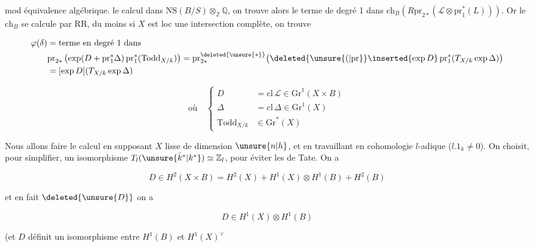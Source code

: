 
 mod équivalence algébrique.     le calcul dans $\mathrm{NS}(B/S)\otimes_{\mathbb Z}\mathbb Q$,  on trouve alors le terme de degré 1 dans $\mathrm{ch}_B(R\mathrm{pr}_{2*}(\mathcal L\otimes\mathrm{pr}_1^*(L)))$. Or le $\mathrm{ch}_B$ se calcule par RR, du moins si $X$ est loc une intersection complète, on trouve

\[
\begin{aligned}
\varphi(\delta)&=\text{terme en degré 1 dans}\\
&\mathrm{pr}_{2*}\left(\exp(D+\mathrm{pr}_1^*\Delta)\,\mathrm{pr}_1^*(\mathrm{Todd}_{X/k})\right)
=\mathrm{pr}_{2*}^{\deleted{\unsure{*}}}\bigl(\deleted{\unsure{(|\mathrm{pr}}}\inserted{\exp D}\,\mathrm{pr}_1^*(T_{X/k}\exp\Delta)\bigr)\\
&=[\exp D](T_{X/k}\exp\Delta)
\end{aligned}
\]

\[
\text{où}\quad\left\{\begin{aligned}
D&=\mathrm{cl}\,\mathcal L\in\mathrm{Gr}^1(X\times B)\\
\Delta&=\mathrm{cl}\,\Delta\in\mathrm{Gr}^1(X)\\
\mathrm{Todd}_{X/k}&\in\mathrm{Gr}^*(X)
\end{aligned}\right.
\]

Nous allons faire le calcul en supposant $X$ lisse de dimension $\unsure{n|h}$, et en travaillant en cohomologie $l$-adique ($l.1_k\ne0$). On choisit, pour simplifier, un isomorphisme $T_l(\unsure{\bar k^*|k^*})\simeq\mathbb Z_l$, pour éviter les  de Tate. On a

\[
D\in H^2(X\times B)=H^2(X)+H^1(X)\otimes H^1(B)+H^2(B)
\]

et en fait $\deleted{\unsure{D}}$ on a

\[
D\in H^1(X)\otimes H^1(B)
\]

(et $D$ définit un isomorphisme entre $H^1(B)$ et $H^1(X)^\vee$\unsure{)|,|),}
